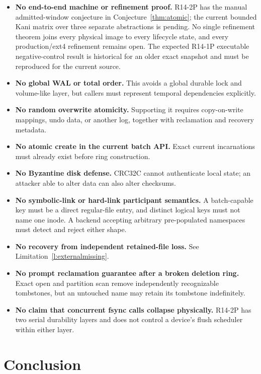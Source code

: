 \documentclass[10pt,twocolumn]{article}
\theoremstyle{remark}
\begin{document}
\begin{itemize}
  \item \textbf{No end-to-end machine or refinement proof.} R14-2P has the manual admitted-window
  conjecture in Conjecture~\ref{thm:atomic}; the current bounded Kani matrix over three separate
  abstractions is pending. No single refinement theorem joins every physical image to every
  lifecycle state, and every production/ext4 refinement remains open. The expected R14-1P
  executable negative-control result is historical for an older exact snapshot and must be
  reproduced for the current source.
  \item \textbf{No global WAL or total order.} This avoids a global durable lock and volume-like
  layer, but callers must represent temporal dependencies explicitly.
  \item \textbf{No random overwrite atomicity.} Supporting it requires copy-on-write mappings,
  undo data, or another log, together with reclamation and recovery metadata.
  \item \textbf{No atomic create in the current batch API.} Exact current incarnations must already
  exist before ring construction.
  \item \textbf{No Byzantine disk defense.} CRC32C cannot authenticate local state; an attacker
  able to alter data can also alter checksums.
  \item \textbf{No symbolic-link or hard-link participant semantics.} A batch-capable key must be a
  direct regular-file entry, and distinct logical keys must not name one inode. A backend accepting
  arbitrary pre-populated namespaces must detect and reject either shape.
  \item \textbf{No recovery from independent retained-file loss.} See
  Limitation~\ref{l:externalmissing}.
  \item \textbf{No prompt reclamation guarantee after a broken deletion ring.} Exact open and
  partition scan remove independently recognizable tombstones, but an untouched name may retain
  its tombstone indefinitely.
  \item \textbf{No claim that concurrent fsync calls collapse physically.} R14-2P has two serial
  durability layers and does not control a device's flush scheduler within either layer.
\end{itemize}

\section{Conclusion}
\end{document}
